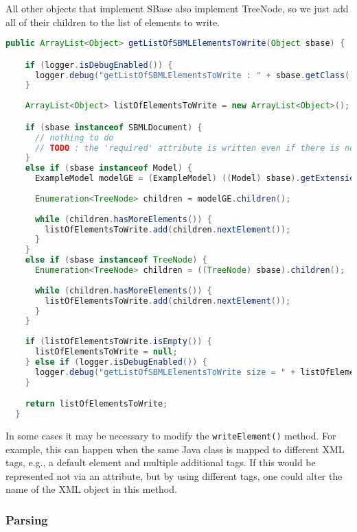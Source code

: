 All other objects that implement SBase also implement TreeNode, so we just add all of their children to the list of elements to write.

\begin{lstlisting}[language=Java,caption={Extension parser: \texttt{getListOfSBMLElementsToWrite()}},label={lst:ModelExtParserListSBMLToWrite}]
  public ArrayList<Object> getListOfSBMLElementsToWrite(Object sbase) {

    if (logger.isDebugEnabled()) {
      logger.debug("getListOfSBMLElementsToWrite : " + sbase.getClass().getCanonicalName());
    }
    
    ArrayList<Object> listOfElementsToWrite = new ArrayList<Object>();

    if (sbase instanceof SBMLDocument) {
      // nothing to do
      // TODO : the 'required' attribute is written even if there is no plugin class for the SBMLDocument, so I am not totally sure how this is done.
    } 
    else if (sbase instanceof Model) {
      ExampleModel modelGE = (ExampleModel) ((Model) sbase).getExtension(ExampleConstant.namespaceURI);
      
      Enumeration<TreeNode> children = modelGE.children();
      
      while (children.hasMoreElements()) {
        listOfElementsToWrite.add(children.nextElement());
      }           
    } 
    else if (sbase instanceof TreeNode) {
      Enumeration<TreeNode> children = ((TreeNode) sbase).children();
      
      while (children.hasMoreElements()) {
        listOfElementsToWrite.add(children.nextElement());
      }
    }
    
    if (listOfElementsToWrite.isEmpty()) {
      listOfElementsToWrite = null;
    } else if (logger.isDebugEnabled()) {
      logger.debug("getListOfSBMLElementsToWrite size = " + listOfElementsToWrite.size());
    }

    return listOfElementsToWrite;
  }
\end{lstlisting}

In some cases it may be necessary to modify the \texttt{writeElement()} method.
For example, this can happen when the same Java class is mapped to different XML tags, e.g., a default element and multiple additional tags.
If this would be represented not via an attribute, but by using different tags, one could alter the name of the XML object in this method.


\subsubsection{Parsing}

